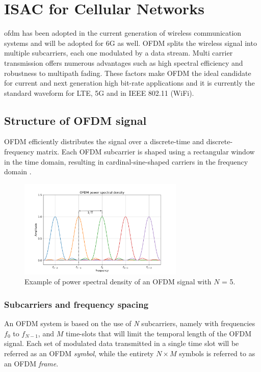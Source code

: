 \chapter{ISAC for Cellular Networks}
\label{chap:theoretical_OFDM}

\gls{ofdm} has been adopted in the current generation of wireless communication systems and will be adopted for 6G as well.
OFDM splits the wireless signal into multiple subcarriers, each one modulated by a data stream. Multi carrier transmission offers numerous advantages such as high spectral efficiency and robustness to multipath fading. These factors make OFDM the ideal candidate for current and next generation high bit-rate applications and it is currently the standard waveform for LTE, 5G and in IEEE 802.11 (WiFi).

\section{Structure of OFDM signal}

OFDM efficiently distributes the signal over a discrete-time and discrete-frequency matrix. Each OFDM subcarrier is shaped using a rectangular window in the time domain, resulting in cardinal-sine-shaped carriers in the frequency domain \cite{Schaich_Wild_2014}.

\begin{figure}[H]
    \centering
    \includegraphics[width=0.7\textwidth]{Images/theoretical/ofdm/ofdm_psd_mod.png}
    \caption{Example of power spectral density of an OFDM signal with $N$ = 5.}
    \label{fig:quadtree}
\end{figure}

\subsection{Subcarriers and frequency spacing}
An OFDM system is based on the use of \textit{N} subcarriers, namely with frequencies $f_0$ to $f_{N-1}$, and $M$ time-slots that will limit the temporal length of the OFDM signal.
Each set of modulated data transmitted in a single time slot will be referred as an OFDM \textit{symbol}, while the entirety $N\times M$ symbols is referred to as an OFDM \textit{frame}.

